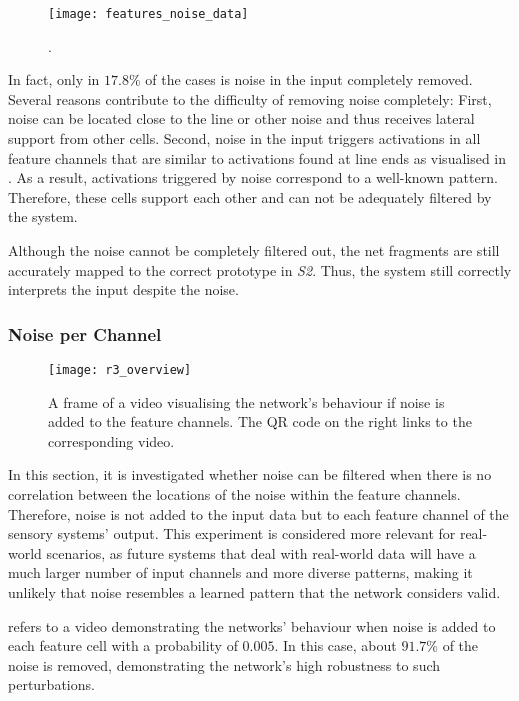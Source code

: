\begin{figure}[h]
    \centering
    \texttt{[image: features\_noise\_data]}
    \caption[Features triggered by noise]{.}
\end{figure}
%
In fact, only in $17.8\%$ of the cases is noise in the input completely removed.
Several reasons contribute to the difficulty of removing noise completely: First, noise can be located close to the line or other noise and thus receives lateral support from other cells. Second, noise in the input triggers activations in all feature channels that are similar to activations found at line ends as visualised in .
As a result, activations triggered by noise correspond to a well-known pattern. Therefore, these cells support each other and can not be adequately filtered by the system.

Although the noise cannot be completely filtered out, the net fragments are still accurately mapped to the correct prototype in \emph{S2}. Thus, the system still correctly interprets the input despite the noise.

\subsubsection{Noise per Channel}
%
\begin{figure}[h]
    \centering
    \texttt{[image: r3\_overview]}
    \caption[Video visualising the network's behaviour with noise in the feature channels]{A frame of a video visualising the network's behaviour if noise is added to the feature channels. The QR code on the right links to the corresponding video.}
\end{figure}
%
In this section, it is investigated whether noise can be filtered when there is no correlation between the locations of the noise within the feature channels.
Therefore, noise is not added to the input data but to each feature channel of the sensory systems' output.
This experiment is considered more relevant for real-world scenarios, as future systems that deal with real-world data will have a much larger number of input channels and more diverse patterns, making it unlikely that noise resembles a learned pattern that the network considers valid.

 refers to a video demonstrating the networks' behaviour when noise is added to each feature cell with a probability of $0.005$.
In this case, about $91.7\%$ of the noise is removed, demonstrating the network's high robustness to such perturbations.

